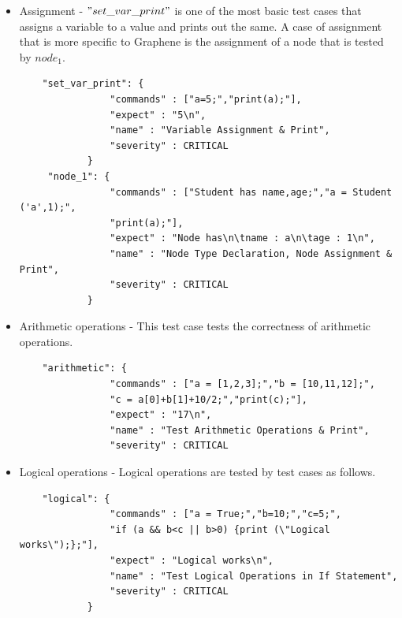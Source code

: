 \documentclass[a4paper]{article}
\begin{document}
\begin{itemize}
\item Assignment - $"set\_var\_print"$ is one of the most basic test cases that assigns a variable to a value and prints out the same. A case of assignment that is more specific to Graphene is the assignment of a node that is tested by $node_1$.
\begin{verbatim}
	"set_var_print": { 
                "commands" : ["a=5;","print(a);"],
                "expect" : "5\n",
                "name" : "Variable Assignment & Print",
                "severity" : CRITICAL
            }
     "node_1": { 
                "commands" : ["Student has name,age;","a = Student ('a',1);",
                "print(a);"],
                "expect" : "Node has\n\tname : a\n\tage : 1\n",
                "name" : "Node Type Declaration, Node Assignment & Print",
                "severity" : CRITICAL
            }
\end{verbatim}

\item Arithmetic operations - This test case tests the correctness of arithmetic operations.
\begin{verbatim}
	"arithmetic": { 
                "commands" : ["a = [1,2,3];","b = [10,11,12];",
                "c = a[0]+b[1]+10/2;","print(c);"],
                "expect" : "17\n",
                "name" : "Test Arithmetic Operations & Print",
                "severity" : CRITICAL
\end{verbatim}

\item Logical operations - Logical operations are tested by test cases as follows.
\begin{verbatim}
	"logical": { 
                "commands" : ["a = True;","b=10;","c=5;",
                "if (a && b<c || b>0) {print (\"Logical works\");};"],
                "expect" : "Logical works\n",
                "name" : "Test Logical Operations in If Statement",
                "severity" : CRITICAL
            }
\end{verbatim}


\end{itemize}
\end{document}
